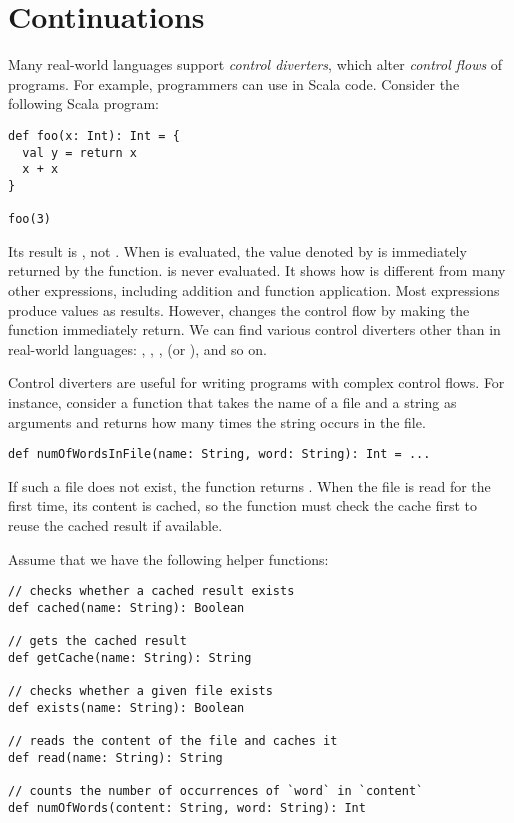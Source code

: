 \setchapterpreamble[u]{\margintoc}
\chapter{Continuations}

\renewcommand{\lang}{\textsf{FAE}\xspace}

Many real-world languages support \textit{control diverters}, which alter
\textit{control flows} of programs.
For example, programmers can use  in Scala code. Consider the
following Scala program:

\begin{verbatim}
def foo(x: Int): Int = {
  val y = return x
  x + x
}

foo(3)
\end{verbatim}

Its result is , not . When  is evaluated, the
value denoted by  is immediately returned by the function. 
is never evaluated. It shows how  is different from many other
expressions, including addition and function application. Most expressions
produce values as results. However,  changes
the control flow by making the function immediately return. We can find various
control diverters other than  in real-world languages:
, , ,  (or ), and
so on.

Control diverters are useful for writing programs with complex control flows.
For instance, consider a function  that takes the name of
a file and a string as arguments and returns how many times the string occurs in
the file.

\begin{verbatim}
def numOfWordsInFile(name: String, word: String): Int = ...
\end{verbatim}

If such a file does not exist, the function returns .
When the file is read for the first time, its content is cached, so the function
must check the cache first to reuse the cached result if available.

Assume that we have the following helper functions:

\begin{verbatim}
// checks whether a cached result exists
def cached(name: String): Boolean

// gets the cached result
def getCache(name: String): String

// checks whether a given file exists
def exists(name: String): Boolean

// reads the content of the file and caches it
def read(name: String): String

// counts the number of occurrences of `word` in `content`
def numOfWords(content: String, word: String): Int
\end{verbatim}

